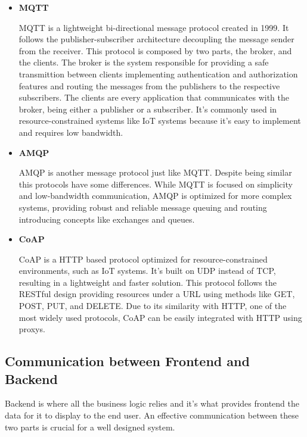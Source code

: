 \begin{itemize}

	\item \textbf{MQTT}

	      MQTT is a lightweight bi-directional message protocol created in 1999.
	      It follows the publisher-subscriber architecture decoupling the message
	      sender from the receiver. This protocol is composed by two parts, the
	      broker, and the clients. The broker is the system responsible for providing
	      a safe transmittion between clients implementing authentication and
	      authorization features and routing the messages from the publishers to
	      the respective subscribers. The clients are every application that
	      communicates with the broker, being either a publisher or a subscriber.
	      It's commonly used in resource-constrained systems like IoT systems because
	      it's easy to implement and requires low bandwidth.

	\item \textbf{AMQP}

	      AMQP is another message protocol just like MQTT.
	      Despite being similar this protocols have some differences. While MQTT is
	      focused on simplicity and low-bandwidth communication, AMQP is optimized for
	      more complex systems, providing robust and reliable message queuing and
	      routing introducing concepts like exchanges and queues.


	\item \textbf{CoAP}

	      CoAP is a HTTP based protocol optimized for resource-constrained
	      environments, such as IoT systems. It's built on UDP instead of TCP,
	      resulting in a lightweight and faster solution.
	      This protocol follows the RESTful design providing resources under a URL
	      using methods like GET, POST, PUT, and DELETE. Due to its similarity with
	      HTTP, one of the most widely used protocols, CoAP can be easily integrated
	      with HTTP using proxys.

\end{itemize}
\subsection{Communication between Frontend and Backend}
Backend is where all the business logic relies and it's what provides frontend
the data for it to display to the end user. An effective communication between
these two parts is crucial for a well designed system.
